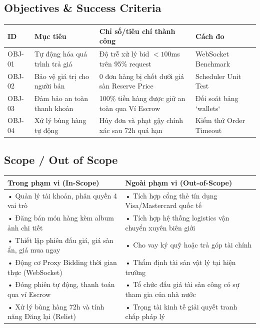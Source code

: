 \documentclass[11pt,a4paper]{article}
\begin{document}
\subsection{Objectives \& Success Criteria}
\begin{table}[H]
    \centering
    \small
    \begin{tabularx}{\textwidth}{|l|p{4.5cm}|p{5cm}|X|}
        \hline
        \textbf{ID} & \textbf{Mục tiêu} & \textbf{Chỉ số/tiêu chí thành công} & \textbf{Cách đo} \\ \hline
        OBJ-01 & Tự động hóa quá trình trả giá & Độ trễ xử lý bid $< 100$ms trên 95\% request & WebSocket Benchmark \\ \hline
        OBJ-02 & Bảo vệ giá trị cho người bán & 0 đơn hàng bị chốt dưới giá sàn Reserve Price & Scheduler Unit Test \\ \hline
        OBJ-03 & Đảm bảo an toàn thanh khoản & 100\% tiền hàng được giữ an toàn qua Ví Escrow & Đối soát bảng `wallets` \\ \hline
        OBJ-04 & Xử lý bùng hàng tự động & Hủy đơn và phạt gậy chính xác sau 72h quá hạn & Kiểm thử Order Timeout \\ \hline
    \end{tabularx}
\end{table}

\subsection{Scope / Out of Scope}
\begin{table}[H]
    \centering
    \small
    \begin{tabularx}{\textwidth}{|X|X|}
        \hline
        \textbf{Trong phạm vi (In-Scope)} & \textbf{Ngoài phạm vi (Out-of-Scope)} \\ \hline
        • Quản lý tài khoản, phân quyền 4 vai trò & • Tích hợp cổng thẻ tín dụng Visa/Mastercard quốc tế \\ \hline
        • Đăng bán món hàng kèm album ảnh chi tiết & • Tích hợp hệ thống logistics vận chuyển xuyên biên giới \\ \hline
        • Thiết lập phiên đấu giá, giá sàn ẩn, giá mua ngay & • Cho vay ký quỹ hoặc trả góp tài chính \\ \hline
        • Động cơ Proxy Bidding thời gian thực (WebSocket) & • Thẩm định tài sản vật lý tại hiện trường \\ \hline
        • Đóng phiên tự động, thanh toán qua ví Escrow & • Tổ chức đấu giá tài sản công có sự tham gia của nhà nước \\ \hline
        • Xử lý bùng hàng 72h và tính năng Đăng lại (Relist) & • Trọng tài kinh tế giải quyết tranh chấp pháp lý \\ \hline
    \end{tabularx}
\end{table}
\end{document}
